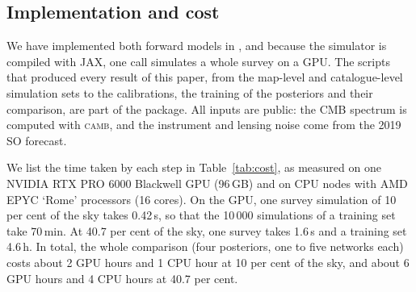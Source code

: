 \subsection{Implementation and cost}\label{sec:sims:cost}

We have implemented both forward models in \classyszlite{}, and because the simulator is compiled with
JAX, one call simulates a whole survey on a GPU. The scripts that produced every result of this paper,
from the map-level and catalogue-level simulation sets to the calibrations, the training of the posteriors
and their comparison, are part of the package. All inputs are public: the CMB spectrum is computed with
\textsc{camb}, and the instrument and lensing noise come from the 2019 SO forecast.

We list the time taken by each step in Table~\ref{tab:cost}, as measured on one NVIDIA RTX PRO 6000
Blackwell GPU (96\,GB) and on CPU nodes with AMD EPYC `Rome' processors (16 cores). On the GPU, one survey
simulation of 10 per cent of the sky takes 0.42\,s, so that the 10\,000 simulations of a training set take
70\,min. At 40.7 per cent of the sky, one survey takes 1.6\,s and a training set 4.6\,h. In total, the
whole comparison (four posteriors, one to five networks each) costs about 2 GPU hours and 1 CPU hour at 10
per cent of the sky, and about 6 GPU hours and 4 CPU hours at 40.7 per cent.

